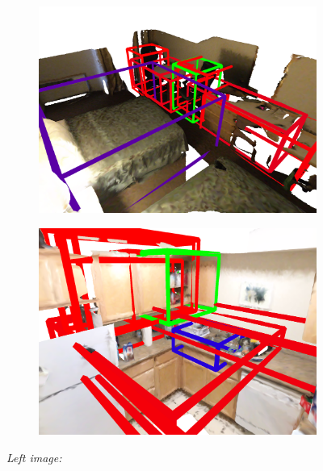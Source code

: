 \documentclass[10pt,twocolumn,letterpaper]{article}
\begin{document}
\begin{figure}[b]
	\centering
	\begin{subfigure}[c]{.49\linewidth}
		\centering
		\includegraphics[width=\linewidth]{figures/gt_scene0221_00_3_0_att_noshade.png}
		\label{fig:example_1}
	\end{subfigure}
	\begin{subfigure}[c]{.49\linewidth}
		\centering
		\includegraphics[width=\textwidth]{figures/gt_scene0164_00_2_0_att_noshade.png}
		\label{fig:example_2}
	\end{subfigure}
	\vspace{-1.\baselineskip}
	\begin{flushleft}
		{\scriptsize 
			\textit{Left image:}\\
}
\end{flushleft}
\end{figure}
\end{document}
